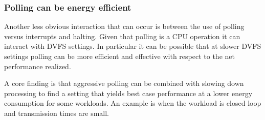  \subsubsection{Polling can be energy efficient}
 Another less obvious interaction that can occur is between the use of polling versus interrupts and halting.  Given that polling is a CPU operation it can interact with DVFS settings.  In particular it can be possible that at slower DVFS settings polling can be more efficient and effective with respect to the net performance realized.  

A core finding is that aggressive polling can be combined with slowing down processing to find a setting that yields best case performance at a lower energy consumption for some workloads.   An example is when the workload is closed loop and transmission times are small. 



